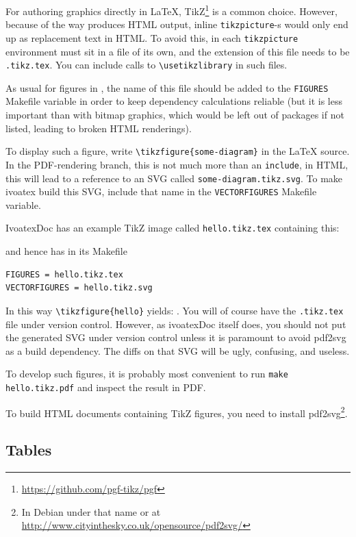 \documentclass[11pt,a4paper]{ivoa}
\begin{document}
For authoring graphics directly in \LaTeX,
TikZ\footnote{\url{https://github.com/pgf-tikz/pgf}} is a common choice.
However, because of the way \ivoatex{} produces HTML output, inline
\verb|tikzpicture|-s would only end up as replacement text in HTML.  To
avoid this, in \ivoatex{} each \verb|tikzpicture| environment must sit
in a file of its own, and the extension of this file needs to be
\verb|.tikz.tex|.  You can include calls to \verb|\usetikzlibrary|
in such files.

As usual for figures in \ivoatex, the name of this file should be added
to the \verb|FIGURES| Makefile variable in order to keep dependency
calculations reliable (but it is less important than with bitmap
graphics, which would be left out of packages if not listed, leading to
broken HTML renderings).

To display such a figure, write
\verb|\tikzfigure{some-diagram}| in the \LaTeX{} source.  In the
PDF-rendering branch, this is not much more than an \verb|include|, in
HTML, this will lead to a reference to an SVG called
\verb|some-diagram.tikz.svg|.  To make ivoatex build this SVG, include
that name in the \verb|VECTORFIGURES| Makefile variable.

IvoatexDoc has an example TikZ image called \verb|hello.tikz.tex|
containing this:



\noindent and hence has in its Makefile

\begin{lstlisting}
FIGURES = hello.tikz.tex
VECTORFIGURES = hello.tikz.svg
\end{lstlisting}

In this way \verb|\tikzfigure{hello}| yields: .  You
will of course have the \verb|.tikz.tex| file under version control.
However, as ivoatexDoc itself does, you should not put the generated SVG
under version control unless it is paramount to avoid pdf2svg as a
build dependency.  The diffs on that SVG will be ugly, confusing, and
useless.

To develop such figures, it is probably most convenient to run
\verb|make hello.tikz.pdf| and inspect the result in PDF.

To build HTML documents containing TikZ figures, you need to
install pdf2svg\footnote{In Debian under that name or at
\url{http://www.cityinthesky.co.uk/opensource/pdf2svg/}}.

\subsection{Tables}
\end{document}
